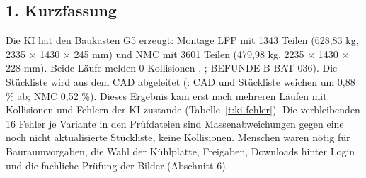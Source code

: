 \documentclass[10pt,a4paper]{article}
\begin{document}
\subsection*{1. Kurzfassung}
Die KI hat den Baukasten G5 erzeugt: Montage LFP mit 1343 Teilen (628,83 kg, 2335 × 1430 × 245 mm) und NMC mit 3601 Teilen (479,98 kg, 2235 × 1430 × 228 mm). Beide Läufe melden 0 Kollisionen , ; BEFUNDE B-BAT-036). Die Stückliste wird aus dem CAD abgeleitet (: CAD und Stückliste weichen um 0,88 \% ab; NMC 0,52 \%). Dieses Ergebnis kam erst nach mehreren Läufen mit Kollisionen und Fehlern der KI zustande (Tabelle~\ref{t:ki-fehler}). Die verbleibenden 16 Fehler je Variante in den Prüfdateien sind Massenabweichungen gegen eine noch nicht aktualisierte Stückliste, keine Kollisionen. Menschen waren nötig für Bauraumvorgaben, die Wahl der Kühlplatte, Freigaben, Downloads hinter Login und die fachliche Prüfung der Bilder (Abschnitt 6).
\end{document}
